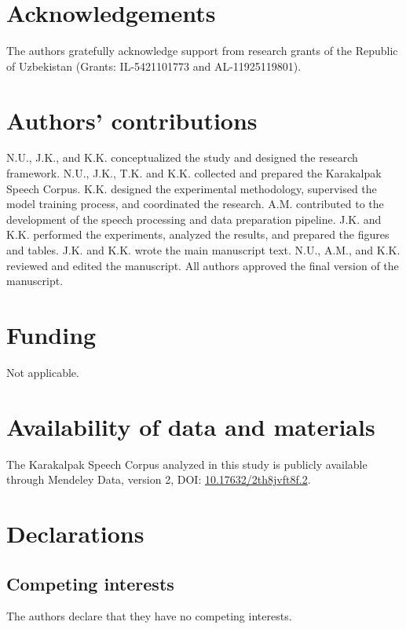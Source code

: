 \documentclass[11pt]{article}
\begin{document}
\section*{Acknowledgements}
The authors gratefully acknowledge support from research grants of the Republic of Uzbekistan (Grants: IL-5421101773 and AL-11925119801).

\section*{Authors' contributions}
N.U., J.K., and K.K. conceptualized the study and designed the research framework. N.U., J.K., T.K. and K.K. collected and prepared the Karakalpak Speech Corpus. K.K. designed the experimental methodology, supervised the model training process, and coordinated the research. A.M. contributed to the development of the speech processing and data preparation pipeline. J.K. and K.K. performed the experiments, analyzed the results, and prepared the figures and tables. J.K. and K.K. wrote the main manuscript text. N.U., A.M., and K.K. reviewed and edited the manuscript. All authors approved the final version of the manuscript.

\section*{Funding}

Not applicable.

\section*{Availability of data and materials}
The Karakalpak Speech Corpus analyzed in this study is publicly available through Mendeley Data, version 2, DOI: \href{https://doi.org/10.17632/2th8jvft8f.2}{10.17632/2th8jvft8f.2}.

\section*{Declarations}

\subsection*{Competing interests}
The authors declare that they have no competing interests.
\end{document}
